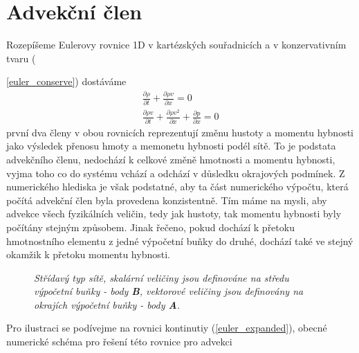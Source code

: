 \section{Advekční člen}
Rozepíšeme Eulerovy rovnice 1D v kartézských souřadnicích a v konzervativním tvaru ({\ref{euler_conserve}) dostáváme
\begin{eqnarray}
\label{euler_expanded}
\frac{\partial{\rho}}{\partial t} + \frac{\partial{\rho v}}{\partial x} = 0 \\
\frac{\partial{\rho v}}{\partial t} + \frac{\partial{\rho v^2}}{\partial x}+\frac{\partial p}{\partial x} = 0
\end{eqnarray}
první dva členy v obou rovnicích reprezentují změnu hustoty a momentu hybnosti jako výsledek přenosu hmoty a memonetu hybnosti podél sítě. To je podstata advekčního členu, nedochází k celkové změně hmotnosti a momentu hybnosti, vyjma toho co do systému vchází a odchází v důsledku okrajových podmínek. Z numerického hlediska je však podstatné, aby ta část numerického výpočtu, která počítá advekční člen byla provedena konzistentně. Tím máme na mysli, aby advekce všech fyzikálních veličin, tedy jak hustoty, tak momentu hybnosti byly počítány stejným způsobem. Jinak řečeno, pokud dochází k přetoku hmotnostního elementu z jedné výpočetní buňky do druhé, dochází také ve stejný okamžik k přetoku momentu hybnosti. 
\begin{figure}
\centering
{}
\caption{\it Střídavý typ sítě, skalární veličiny jsou definováne na středu výpočetní buňky - body {\bf B}, vektorové veličiny jsou definovány na okrajích výpočetní buňky - body {\bf A}.}
\label{figure:grid_staggered}
\end{figure}
Pro ilustraci se podívejme na rovnici kontinutiy (\ref{euler_expanded}), obecné numerické schéma pro řešení této rovnice pro advekci
\begin{equation}

\end{equation}}
